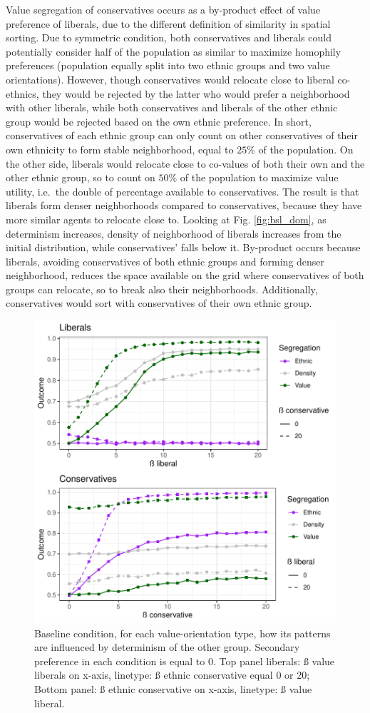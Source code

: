 \documentclass[
]{article}
\begin{document}
Value segregation of conservatives occurs as a by-product effect of
value preference of liberals, due to the different definition of
similarity in spatial sorting. Due to symmetric condition, both
conservatives and liberals could potentially consider half of the
population as similar to maximize homophily preferences (population
equally split into two ethnic groups and two value orientations).
However, though conservatives would relocate close to liberal
co-ethnics, they would be rejected by the latter who would prefer a
neighborhood with other liberals, while both conservatives and liberals
of the other ethnic group would be rejected based on the own ethnic
preference. In short, conservatives of each ethnic group can only count
on other conservatives of their own ethnicity to form stable
neighborhood, equal to \(25\%\) of the population. On the other side,
liberals would relocate close to co-values of both their own and the
other ethnic group, so to count on \(50\%\) of the population to
maximize value utility, i.e.~the double of percentage available to
conservatives. The result is that liberals form denser neighborhoods
compared to conservatives, because they have more similar agents to
relocate close to. Looking at Fig. \ref{fig:bsl_dom}, as determinism
increases, density of neighborhood of liberals increases from the
initial distribution, while conservatives' falls below it. By-product
occurs because liberals, avoiding conservatives of both ethnic groups
and forming denser neighborhood, reduces the space available on the grid
where conservatives of both groups can relocate, so to break also their
neighborhoods. Additionally, conservatives would sort with conservatives
of their own ethnic group.

\begin{figure}[H]

{\centering \includegraphics[width=0.7\linewidth]{ev_rum_files/figure-latex/bsl_fct-1} 

}

\caption{Baseline condition, for each value-orientation type, how its patterns are influenced by determinism of the other group. Secondary preference in each condition is equal to 0. Top panel liberals: ß value liberals on x-axis, linetype: ß ethnic conservative equal 0 or 20; Bottom panel: ß ethnic conservative on x-axis, linetype: ß value liberal.}\label{fig:bsl_fct}
\end{figure}
\end{document}
